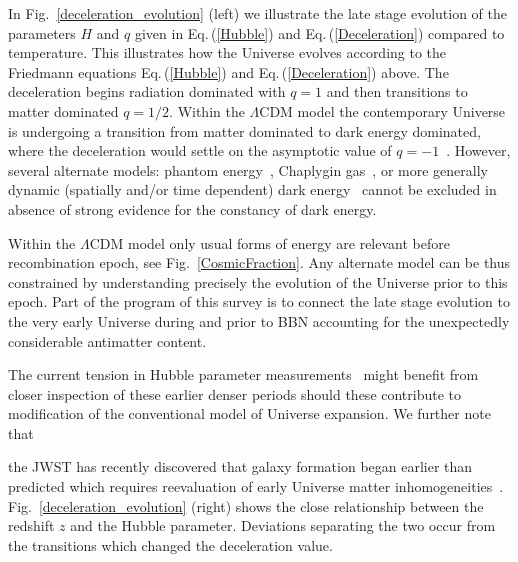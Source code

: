 \documentclass[universe,article,submit,moreauthors,pdftex,a4paper]{Definitions/mdpi}
\newcommand{\req}[1]{Eq.\,(\ref{#1})}
\newcommand*{\rf}[1]{Fig.~{\ref{#1}}}
\newcommand*{\xblue}{\color{blue}}
\begin{document}
In \rf{deceleration_evolution} (left) we illustrate the late stage evolution of the parameters $H$ and $q$ given in \req{Hubble} and \req{Deceleration} compared to temperature. This illustrates how the Universe evolves according to the Friedmann equations \req{Hubble} and \req{Deceleration} above. The deceleration begins radiation dominated with $q=1$ and then transitions to matter dominated $q=1/2$.  {\xblue Within the $\Lambda$CDM model} the contemporary Universe is undergoing a transition from matter dominated to dark energy dominated, where the deceleration would  settle on the asymptotic value of $q=-1$~\cite{Rafelski:2013yka}. {\xblue However, several alternate models:  phantom energy~\cite{Caldwell:2003vq}, Chaplygin gas~\cite{Bilic:2001cg}, or more generally dynamic (spatially and/or time dependent) dark energy~\cite{Benevento:2020fev} cannot be excluded in absence of strong evidence for the constancy of dark energy.}

{\xblue Within the $\Lambda$CDM model only usual forms of energy are relevant before recombination epoch, see \rf{CosmicFraction}. Any alternate model can be thus constrained by understanding precisely the evolution of the Universe prior to this epoch. Part of the program of this survey is to connect the late stage evolution to the very early Universe during and prior to BBN  accounting for the unexpectedly considerable antimatter content. 

The current tension in Hubble parameter measurements~\cite{Perivolaropoulos:2021jda,DiValentino:2021izs,Aluri:2022hzs} might benefit from closer inspection of these earlier denser periods should these contribute to modification of the conventional model of Universe expansion. We further note that} the JWST has recently discovered that galaxy formation began earlier than predicted which requires reevaluation of early Universe matter inhomogeneities~\cite{Yan:2022sxd}. \rf{deceleration_evolution} (right) shows the close relationship between the redshift $z$ and the Hubble parameter. Deviations separating the two occur from the transitions which changed the deceleration value.
\end{document}
